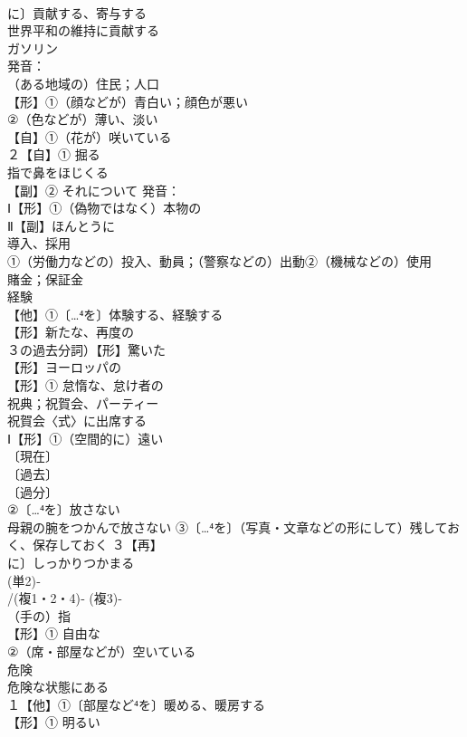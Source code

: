 \documentclass[8pt]{extreport}
\begin{document}
\begin{CJK}{UTF8}{min}
\\	に〕貢献する、寄与する 
\\	世界平和の維持に貢献する
\\	ガソリン 
\\	発音：
\\	（ある地域の）住民；人口 
\\	【形】①（顔などが）青白い；顔色が悪い 
\\	②（色などが）薄い、淡い
\\	【自】①（花が）咲いている 
\\	２【自】① 掘る 
\\	指で鼻をほじくる
\\	【副】② それについて 発音：
\\	Ⅰ【形】①（偽物ではなく）本物の 
\\	Ⅱ【副】ほんとうに
\\	導入、採用 
\\	①（労働力などの）投入、動員；（警察などの）出動②（機械などの）使用 
\\	賭金；保証金
\\	経験 
\\	【他】①〔…⁴を〕体験する、経験する 
\\	【形】新たな、再度の
\\	３の過去分詞）【形】驚いた
\\	【形】ヨーロッパの 
\\	【形】① 怠惰な、怠け者の 
\\	祝典；祝賀会、パーティー 
\\	祝賀会〈式〉に出席する
\\	Ⅰ【形】①（空間的に）遠い 
\\	〔現在〕
\\	〔過去〕
\\	〔過分〕
\\	②〔…⁴を〕放さない 
\\	母親の腕をつかんで放さない ③〔…⁴を〕（写真・文章などの形にして）残しておく、保存しておく ３【再】
\\	に〕しっかりつかまる
\\	(単2)‐
\\	/(複1・2・4)‐ (複3)‐
\\	（手の）指 
\\	【形】① 自由な 
\\	②（席・部屋などが）空いている
\\	危険 
\\	危険な状態にある
\\	１【他】①〔部屋など⁴を〕暖める、暖房する 
\\	【形】① 明るい 

\end{CJK}
\end{document}
